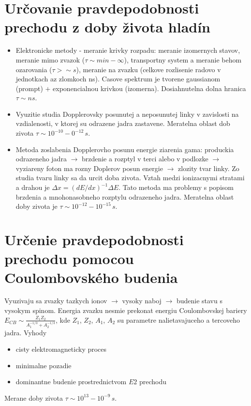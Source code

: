 \documentclass[../../main.tex]{subfiles}
\begin{document}
\section{Určovanie pravdepodobnosti prechodu z doby života hladín}
\begin{itemize}
	\item Elektronicke metody - meranie krivky rozpadu: meranie izomernych stavov, meranie mimo zvazok ($\tau \sim min-\infty$), transportny system a meranie behom ozarovania ($\tau > \sim s$), meranie na zvazku (celkove rozlisenie radovo v jednotkach az zlomkoch ns). Casove spektrum je tvorene gaussianom (prompt) $+$ exponencialnou krivkou (izomerna). Dosiahnutelna dolna hranica $\tau \sim ns$.
	\item Vyuzitie studia Dopplerovsky posunutej a neposunutej linky v zavislosti na vzdialenosti, v ktorej su odrazene jadra zastavene. Meratelna oblast dob zivota $\tau \sim 10^{-10}- 0^{-12}\,s$.
	\item Metoda zoslabenia Dopplerovho posunu energie ziarenia gama: produckia odrazeneho jadra $\rightarrow$ brzdenie a rozptyl v terci alebo v podlozke $\rightarrow$ vyziareny foton ma rozny Doplerov posun energie $\rightarrow$ zlozity tvar linky. Zo studia tvaru linky sa da urcit doba zivota. Vztah medzi ionizacnymi stratami a drahou je $\Delta x=(dE/dx)^{-1}\Delta E$. Tato metoda ma problemy s popisom brzdenia a mnohonasobneho rozptylu odrazeneho jadra. Meratelna oblast doby zivota je $\tau \sim 10^{-12}-10^{-15}\,s$.
\end{itemize}
\section{Určenie pravdepodobnosti prechodu pomocou Coulombovského budenia}
Vyuzivaju sa zvazky tazkych ionov $\rightarrow$ vysoky naboj $\rightarrow$ budenie stavu s vysokym spinom. Energia zvazku nesmie prekonat energiu Coulombovskej bariery $E_{CB} \sim \frac{Z_1Z_2}{A_1^{-1/3}+A_2^{-1/3}}$, kde $Z_1$, $Z_2$, $A_1$, $A_2$ su parametre nalietavajuceho a tercoveho jadra. Vyhody
\begin{itemize}
	\item cisty elektromagneticky proces
	\item minimalne pozadie
	\item dominantne budenie prostrednictvom $E2$ prechodu 
\end{itemize}
Merane doby zivota $\tau \sim 10^{13}-10^{-9}\,s$.
\end{document}
